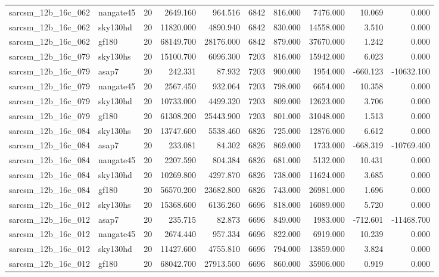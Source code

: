 \documentclass{article}
\begin{document}
\begin{longtable}{llrrrrrrrr}
sarcsm\_12b\_16c\_062 & nangate45 & 20 & 2649.160 & 964.516 & 6842 & 816.000 & 7476.000 & 10.069 & 0.000 \\
sarcsm\_12b\_16c\_062 & sky130hd & 20 & 11820.000 & 4890.940 & 6842 & 830.000 & 14558.000 & 3.510 & 0.000 \\
sarcsm\_12b\_16c\_062 & gf180 & 20 & 68149.700 & 28176.000 & 6842 & 879.000 & 37670.000 & 1.242 & 0.000 \\
sarcsm\_12b\_16c\_079 & sky130hs & 20 & 15100.700 & 6096.300 & 7203 & 816.000 & 15942.000 & 6.023 & 0.000 \\
sarcsm\_12b\_16c\_079 & asap7 & 20 & 242.331 & 87.932 & 7203 & 900.000 & 1954.000 & -660.123 & -10632.100 \\
sarcsm\_12b\_16c\_079 & nangate45 & 20 & 2567.450 & 932.064 & 7203 & 798.000 & 6654.000 & 10.358 & 0.000 \\
sarcsm\_12b\_16c\_079 & sky130hd & 20 & 10733.000 & 4499.320 & 7203 & 809.000 & 12623.000 & 3.706 & 0.000 \\
sarcsm\_12b\_16c\_079 & gf180 & 20 & 61308.200 & 25443.900 & 7203 & 801.000 & 31048.000 & 1.513 & 0.000 \\
sarcsm\_12b\_16c\_084 & sky130hs & 20 & 13747.600 & 5538.460 & 6826 & 725.000 & 12876.000 & 6.612 & 0.000 \\
sarcsm\_12b\_16c\_084 & asap7 & 20 & 233.081 & 84.302 & 6826 & 869.000 & 1733.000 & -668.319 & -10769.400 \\
sarcsm\_12b\_16c\_084 & nangate45 & 20 & 2207.590 & 804.384 & 6826 & 681.000 & 5132.000 & 10.431 & 0.000 \\
sarcsm\_12b\_16c\_084 & sky130hd & 20 & 10269.800 & 4297.870 & 6826 & 738.000 & 11624.000 & 3.685 & 0.000 \\
sarcsm\_12b\_16c\_084 & gf180 & 20 & 56570.200 & 23682.800 & 6826 & 743.000 & 26981.000 & 1.696 & 0.000 \\
sarcsm\_12b\_16c\_012 & sky130hs & 20 & 15368.600 & 6136.260 & 6696 & 818.000 & 16089.000 & 5.720 & 0.000 \\
sarcsm\_12b\_16c\_012 & asap7 & 20 & 235.715 & 82.873 & 6696 & 849.000 & 1983.000 & -712.601 & -11468.700 \\
sarcsm\_12b\_16c\_012 & nangate45 & 20 & 2674.440 & 957.334 & 6696 & 822.000 & 6919.000 & 10.239 & 0.000 \\
sarcsm\_12b\_16c\_012 & sky130hd & 20 & 11427.600 & 4755.810 & 6696 & 794.000 & 13859.000 & 3.824 & 0.000 \\
sarcsm\_12b\_16c\_012 & gf180 & 20 & 68042.700 & 27913.500 & 6696 & 860.000 & 35906.000 & 0.919 & 0.000 \\

\end{longtable}
\end{document}
